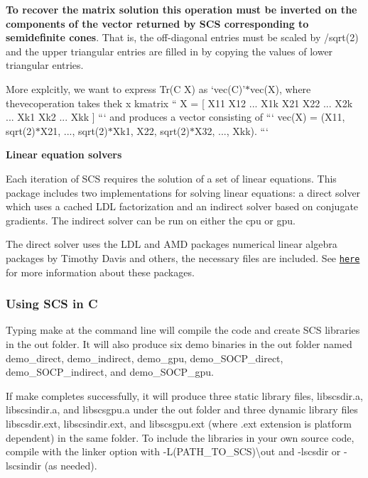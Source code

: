 {\bfseries To recover the matrix solution this operation must be inverted on the components of the vector returned by S\-C\-S corresponding to semidefinite cones}. That is, the off-\/diagonal entries must be scaled by {/sqrt(2)} and the upper triangular entries are filled in by copying the values of lower triangular entries.

More explcitly, we want to express {\ttfamily Tr(\-C X)} as `vec(C)'$\ast$vec(X){\ttfamily , where the}vec{\ttfamily operation takes the}k x k{\ttfamily matrix }`` X = \mbox{[} X11 X12 ... X1k X21 X22 ... X2k ... Xk1 Xk2 ... Xkk \mbox{]} ``` and produces a vector consisting of ``` vec(\-X) = (X11, sqrt(2)$\ast$\-X21, ..., sqrt(2)$\ast$\-Xk1, X22, sqrt(2)$\ast$\-X32, ..., Xkk). ```

{\bfseries Linear equation solvers}

Each iteration of S\-C\-S requires the solution of a set of linear equations. This package includes two implementations for solving linear equations\-: a direct solver which uses a cached L\-D\-L factorization and an indirect solver based on conjugate gradients. The indirect solver can be run on either the cpu or gpu.

The direct solver uses the L\-D\-L and A\-M\-D packages numerical linear algebra packages by Timothy Davis and others, the necessary files are included. See \href{http://www.cise.ufl.edu/research/sparse/}{\tt here} for more information about these packages.

\subsubsection*{Using S\-C\-S in C}

Typing {\ttfamily make} at the command line will compile the code and create S\-C\-S libraries in the {\ttfamily out} folder. It will also produce six demo binaries in the {\ttfamily out} folder named {\ttfamily demo\-\_\-direct}, {\ttfamily demo\-\_\-indirect}, {\ttfamily demo\-\_\-gpu}, {\ttfamily demo\-\_\-\-S\-O\-C\-P\-\_\-direct}, {\ttfamily demo\-\_\-\-S\-O\-C\-P\-\_\-indirect}, and {\ttfamily demo\-\_\-\-S\-O\-C\-P\-\_\-gpu}.

If {\ttfamily make} completes successfully, it will produce three static library files, {\ttfamily libscsdir.\-a}, {\ttfamily libscsindir.\-a}, and {\ttfamily libscsgpu.\-a} under the {\ttfamily out} folder and three dynamic library files {\ttfamily libscsdir.\-ext}, {\ttfamily libscsindir.\-ext}, and {\ttfamily libscsgpu.\-ext} (where {\ttfamily .ext} extension is platform dependent) in the same folder. To include the libraries in your own source code, compile with the linker option with {\ttfamily -\/\-L(P\-A\-T\-H\-\_\-\-T\-O\-\_\-\-S\-C\-S)\textbackslash{}out} and {\ttfamily -\/lscsdir} or {\ttfamily -\/lscsindir} (as needed).

